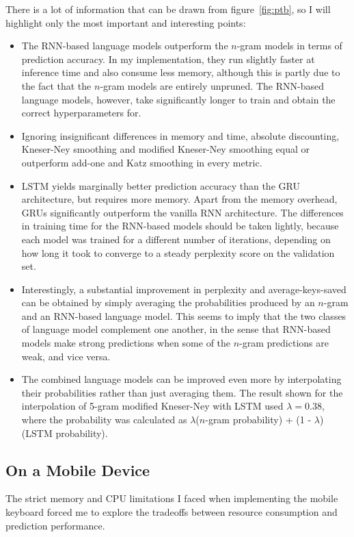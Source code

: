 \documentclass[a4paper, 12pt]{report}
\begin{document}
There is a lot of information that can be drawn from figure~\ref{fig:ptb}, so I will highlight only the most important and interesting points:
\begin{itemize}
\item
	The RNN-based language models outperform the $n$-gram models in terms of prediction accuracy. In my implementation, they run slightly faster at inference time and also consume less memory, although this is partly due to the fact that the $n$-gram models are entirely unpruned. The RNN-based language models, however, take significantly longer to train and obtain the correct hyperparameters for.
\item
	Ignoring insignificant differences in memory and time, absolute discounting, Kneser-Ney smoothing and modified Kneser-Ney smoothing equal or outperform add-one and Katz smoothing in every metric.
\item
	LSTM yields marginally better prediction accuracy than the GRU architecture, but requires more memory. Apart from the memory overhead, GRUs significantly outperform the vanilla RNN architecture. The differences in training time for the RNN-based models should be taken lightly, because each model was trained for a different number of iterations, depending on how long it took to converge to a steady perplexity score on the validation set.
\item
	Interestingly, a substantial improvement in perplexity and average-keys-saved can be obtained by simply averaging the probabilities produced by an $n$-gram and an RNN-based language model. This seems to imply that the two classes of language model complement one another, in the sense that RNN-based models make strong predictions when some of the $n$-gram predictions are weak, and vice versa.
\item
	The combined language models can be improved even more by interpolating their probabilities rather than just averaging them. The result shown for the interpolation of 5-gram modified Kneser-Ney with LSTM used $\lambda = 0.38$, where the probability was calculated as $\lambda$($n$-gram probability) + (1 - $\lambda$)(LSTM probability).
\end{itemize}

\subsection{On a Mobile Device}

The strict memory and CPU limitations I faced when implementing the mobile keyboard forced me to explore the tradeoffs between resource consumption and prediction performance. \\
\end{document}

